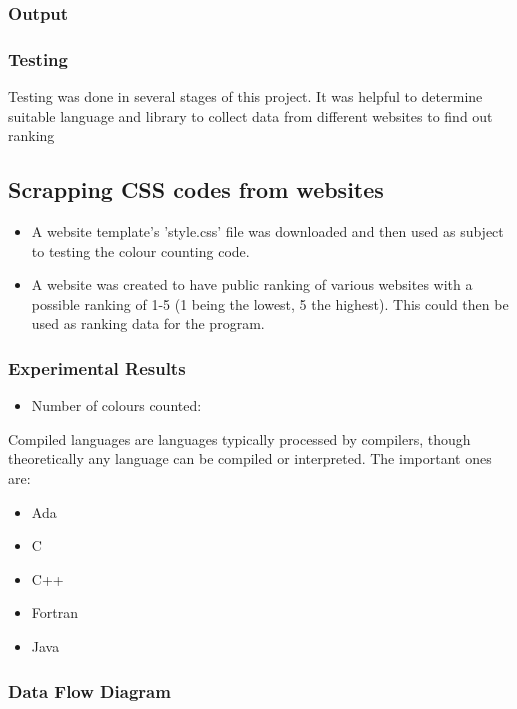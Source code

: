 \documentclass[11pt]{beamer}
\begin{document}
\begin{frame}
\frametitle{Output}
\end{frame}
\begin{frame}
\frametitle{Testing}
Testing was done in several stages of this project. It was helpful to determine suitable language and library to collect data from different websites to find out ranking\\
\subsection{Scrapping CSS codes from websites}
\begin{itemize}
	\item A website template's 'style.css' file was downloaded and then used as subject to testing the colour counting code.
	\item A website was created to have public ranking of various websites with a possible ranking of 1-5 (1 being the lowest, 5 the highest). This could then be used as ranking data for the program.
\end{itemize}
\end{frame}

\begin{frame}
\frametitle{Experimental Results}
\begin{itemize}
	\item Number of colours counted:
\end{itemize}
Compiled languages are languages typically processed by compilers, though theoretically any language can be compiled or interpreted. The important ones are:
\begin{itemize}
	\item Ada
	\item C
	\item C++
	\item Fortran
	\item Java
\end{itemize}
\end{frame}
\begin{frame}
\frametitle{Data Flow Diagram}
\end{frame}
\end{document}
